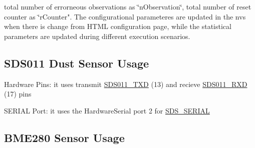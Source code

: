  total number of errorneous observations as \char`\"{}n\+Observation\char`\"{}, total number of reset counter as \char`\"{}r\+Counter". The configurational parameteres are updated in the nvs when there is change from H\+T\+ML configuration page, while the statistical parameters are updated during different execution scenarios. \hypertarget{index_sdso11}{}\subsection{S\+D\+S011 Dust Sensor Usage}\label{index_sdso11}

\begin{DoxyItemize}
\item Hardware Pins\+: it uses transmit \mbox{\hyperlink{sensor_8h_a7130f8006502cdaa31094baa3f4dd3fa}{S\+D\+S011\+\_\+\+T\+XD}} (13) and recieve \mbox{\hyperlink{sensor_8h_ad2b404eb4de525cef31b8413f5d14b13}{S\+D\+S011\+\_\+\+R\+XD}} (17) pins
\item S\+E\+R\+I\+AL Port\+: it uses the Hardware\+Serial port 2 for \mbox{\hyperlink{sensor_8h_a8f7824c0f2a3aa7e9bac94eac190fa7e}{S\+D\+S\+\_\+\+S\+E\+R\+I\+AL}} 
\end{DoxyItemize}\hypertarget{index_bme280}{}\subsection{B\+M\+E280 Sensor Usage}\label{index_bme280}

